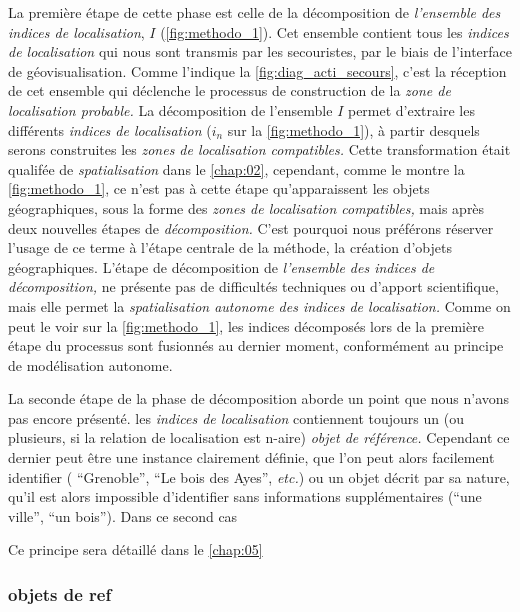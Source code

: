 La première étape de cette phase est celle de la décomposition de
\emph{l'ensemble des indices de localisation}, \(I\)
(\autoref{fig:methodo_1}). Cet ensemble contient tous les
\emph{indices de localisation} qui nous sont transmis par les
secouristes, par le biais de l'interface de géovisualisation. Comme
l'indique la \autoref{fig:diag_acti_secours}, c'est la réception de
cet ensemble qui déclenche le processus de construction de la
\emph{zone de localisation probable.} La décomposition de l'ensemble
\(I\) permet d'extraire les différents \emph{indices de localisation}
(\(i_n\) sur la \autoref{fig:methodo_1}), à partir desquels serons
construites les\emph{ zones de localisation compatibles.} Cette
transformation était qualifée de \emph{spatialisation} dans le
\autoref{chap:02}, cependant, comme le montre la
\autoref{fig:methodo_1}, ce n'est pas à cette étape qu'apparaissent
les objets géographiques, sous la forme des \emph{zones de
  localisation compatibles,} mais après deux nouvelles étapes de
\emph{décomposition.} C'est pourquoi nous préférons réserver l'usage
de ce terme à l'étape centrale de la méthode, la création d'objets
géographiques. L'étape de décomposition de \emph{l'ensemble des
  indices de décomposition,} ne présente pas de difficultés techniques
ou d'apport scientifique, mais elle permet la \emph{spatialisation
  autonome des indices de localisation.} Comme on peut le voir sur la
\autoref{fig:methodo_1}, les indices décomposés lors de la première
étape du processus sont fusionnés au dernier moment, conformément au
principe de modélisation autonome.

La seconde étape de la phase de décomposition aborde un point que
nous n'avons pas encore présenté.
%
les \emph{indices de localisation} contiennent toujours un (ou
plusieurs, si la relation de localisation est n-aire) \emph{objet de
  référence.} Cependant ce dernier peut être une instance clairement
définie, que l'on peut alors facilement identifier (\eg
\enquote{Grenoble}, \enquote{Le bois des Ayes}, \emph{etc.}) ou un
objet décrit par sa nature, qu'il est alors impossible d'identifier
sans informations supplémentaires (\eg \enquote{une ville},
\enquote{un bois}). Dans ce second cas



Ce principe sera détaillé dans le \autoref{chap:05}

\subsubsection{objets de ref}

